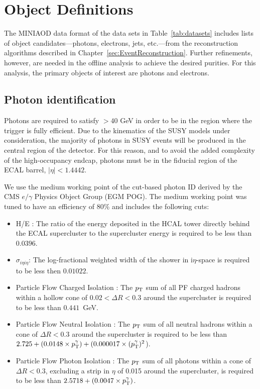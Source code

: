 \section{Object Definitions}
\label{sec:ObjSelect}

The MINIAOD data format of the data sets in Table~\ref{tab:datasets} includes lists of object candidates---photons, electrons, jets, etc.---from the reconstruction algorithms described in Chapter~\ref{sec:EventReconstruction}. Further refinements, however, are needed in the offline analysis to achieve the desired purities. For this analysis, the primary objects of interest are photons and electrons.

\subsection{Photon identification}
\label{sec:phoID}
Photons are required to satisfy \pT $> 40$ GeV in order to be in the region where the trigger is fully efficient. Due to the kinematics of the SUSY models under consideration, the majority of photons in SUSY events will be produced in the central region of the detector. For this reason, and to avoid the added complexity of the high-occupancy endcap, photons must be in the fiducial region of the ECAL barrel, $|\eta| < 1.4442$. 

We use the medium working point of the cut-based photon ID derived by the CMS $e/\gamma$ Physics Object Group (EGM POG). The medium working point was tuned to have an efficiency of 80\% and includes the following cuts:

\begin{itemize}
\item { H/E :} The ratio of the energy deposited in the HCAL tower directly behind the ECAL supercluster to the supercluster energy is required to be less than $0.0396$.
\item {$\sigma_{i{\eta}i{\eta}}$:} The log-fractional weighted width of the shower in i{$\eta$}-space is required to be less then $0.01022$.
\item {Particle Flow Charged Isolation :} The $p_{\mathrm{T}}$ sum of all PF charged hadrons within a hollow cone of $0.02 < \Delta R < 0.3$ around the supercluster is required to be less than $0.441$~GeV.
\item {Particle Flow Neutral Isolation :} The $p_{\mathrm{T}}$ sum of all neutral hadrons within a cone of $\Delta R <0.3$ around the supercluster
                                              is required to be less than $2.725 + (0.0148 \times p_{\mathrm{T}}^{\gamma}) + (0.000017 \times (p_{\mathrm{T}}^{\gamma})^2$).
\item {Particle Flow Photon Isolation :} The $p_{\mathrm{T}}$ sum of all photons within a cone of $\Delta R < 0.3$,
                                             excluding a strip in $\eta$ of 0.015 around the supercluster, is required to be less than $2.5718 + (0.0047 \times p_{\mathrm{T}}^{\gamma})$.
\end{itemize}

